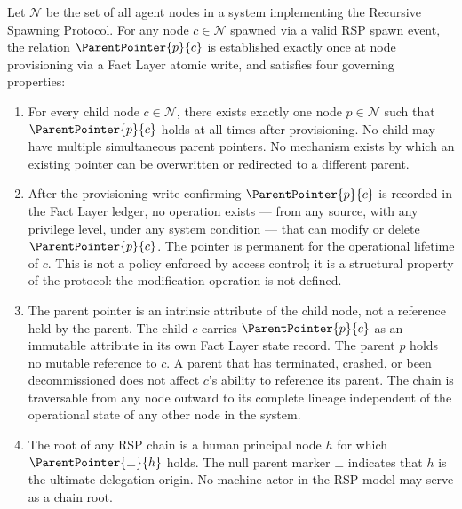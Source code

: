 \begin{definition}[ParentPointer]
\label{def:parent-pointer}
Let $\mathcal{N}$ be the set of all agent nodes in a \bxthree{} system implementing the Recursive Spawning Protocol. For any node $c \in \mathcal{N}$ spawned via a valid RSP spawn event, the relation $\ParentPointer{p}{c}$ is established exactly once at node provisioning via a Fact Layer atomic write, and satisfies four governing properties:

\begin{enumerate}
    \item[(P1) \textbf{Uniqueness}] For every child node $c \in \mathcal{N}$, there exists exactly one node $p \in \mathcal{N}$ such that $\ParentPointer{p}{c}$ holds at all times after provisioning. No child may have multiple simultaneous parent pointers. No mechanism exists by which an existing pointer can be overwritten or redirected to a different parent.

    \item[(P2) \textbf{Immutability}] After the provisioning write confirming $\ParentPointer{p}{c}$ is recorded in the Fact Layer ledger, no operation exists --- from any source, with any privilege level, under any system condition --- that can modify or delete $\ParentPointer{p}{c}$. The pointer is permanent for the operational lifetime of $c$. This is not a policy enforced by access control; it is a structural property of the protocol: the modification operation is not defined.

    \item[(P3) \textbf{Directionality}] The parent pointer is an intrinsic attribute of the child node, not a reference held by the parent. The child $c$ carries $\ParentPointer{p}{c}$ as an immutable attribute in its own Fact Layer state record. The parent $p$ holds no mutable reference to $c$. A parent that has terminated, crashed, or been decommissioned does not affect $c$'s ability to reference its parent. The chain is traversable from any node outward to its complete lineage independent of the operational state of any other node in the system.

    \item[(P4) \textbf{Human Anchor Termination}] The root of any RSP chain is a human principal node $h$ for which $\ParentPointer{\bot}{h}$ holds. The null parent marker $\bot$ indicates that $h$ is the ultimate delegation origin. No machine actor in the RSP model may serve as a chain root.
\end{enumerate}
\end{definition}

